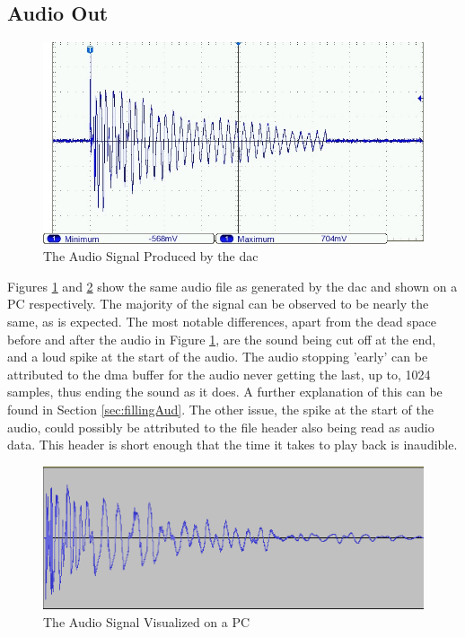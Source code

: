 \documentclass[12pt,a4paper]{report}
\begin{document}
\subsection{Audio Out}
\begin{figure}[h!]
	\centering
	\includegraphics[width=0.6 \textwidth]{F0009TEK.jpg}
	\caption{The Audio Signal Produced by the \ac{dac}}
	\label{fig:dacOut}
\end{figure}
\noindent Figures \ref{fig:dacOut} and \ref{fig:audioFile} show the same audio file as generated by the \ac{dac} and shown on a PC respectively. The majority of the signal can be observed to be nearly the same, as is expected. The most notable differences, apart from the dead space before and after the audio in Figure \ref{fig:dacOut}, are the sound being cut off at the end, and a loud spike at the start of the audio. The audio stopping 'early' can be attributed to the \ac{dma} buffer for the audio never getting the last, up to, 1024 samples, thus ending the sound as it does. A further explanation of this can be found in Section \ref{sec:fillingAud}. The other issue, the spike at the start of the audio, could possibly be attributed to the file header also being read as audio data. This header is short enough that the time it takes to play back is inaudible.
\begin{figure}[h!]
	\centering
	\includegraphics[width=0.6 \textwidth]{audFile.PNG}
	\caption{The Audio Signal Visualized on a PC}
	\label{fig:audioFile}
\end{figure}
\newpage
\end{document}
